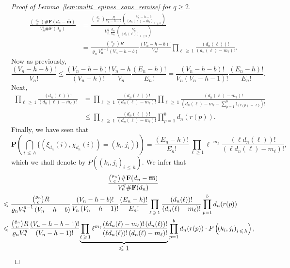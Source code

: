 \documentclass[10pt]{amsart}
\theoremstyle{definition}\newtheorem{defi}[theo]{Definition}\newtheorem{rema}[theo]{Remark}\newtheorem{exam}[theo]{Example}\newtheorem{exem}[theo]{Example}\newtheorem{nota}[theo]{Notation}
\newcommand{\ensembles}[1]{\mathbf{#1}}
\renewcommand{\P}{\ensembles{P}}
\newcommand{\1}{\ensembles{1}}
\newcommand{\ind}[1]{\1_{\{#1\}}}
\newcommand{\m}{\mathbf{m}}
\renewcommand{\le}{\leqslant}
\renewcommand{\ge}{\geqslant}
\newcommand{\edges}{E}
\newcommand{\vertices}{V}
\providecommand{\?}{}
\begin{document}
\begin{proof}[Proof of Lemma~\ref{lem:multi_epines_sans_remise} for $q \ge 2$]
\begin{align*}
\frac{\binom{\varrho_n}{c} \#\ensembles{F}\left(d_n - \overline{\m}\right)}{\vertices_n^q \#\ensembles{F}(d_n)} &= \frac{\binom{\varrho_n}{c} \frac{R}{\vertices_n-h-b} \binom{\vertices_n-h-b}{\left(d_n(\ell)-\overline{m}_\ell\right)_{\ell\,\ge\, 0}}}{\vertices_n^q \frac{\varrho_n}{\vertices_n} \binom{\vertices_n}{\left(d_n(\ell)\right)_{\ell\,\ge\, 0}}}
\\
&= \frac{\binom{\varrho_n}{c} R}{\varrho_n \vertices_n^{q-1} \left(\vertices_n-h-b\right)}
\frac{\left(\vertices_n-h-b\right)!}{\vertices_n!}
\prod_{\ell\,\ge\,1} \frac{\left(d_n(\ell)\right)!}{\left(d_n(\ell)-\overline{m}_\ell\right)!}.
\end{align*}
Now as previously,
\[
\frac{\left(\vertices_n-h-b\right)!}{\vertices_n!}
\le \frac{\left(\vertices_n-h-b\right)!}{\left(\vertices_n - h\right)!} \frac{\vertices_n-h}{\vertices_n} \frac{\left(\edges_n - h\right)!}{\edges_n!} = \frac{\left(\vertices_n-h-b\right)!}{\vertices_n\left(\vertices_n - h - 1\right)!} \frac{\left(\edges_n - h\right)!}{\edges_n!}.
\]
Next,
\begin{align*}
\prod_{\ell\,\ge\,1} \frac{\left(d_n(\ell)\right)!}{\left(d_n(\ell)-\overline{m}_\ell\right)!} &= \prod_{\ell\,\ge\,1} \frac{\left(d_n(\ell)\right)!}{\left(d_n(\ell)-m_\ell\right)!}
\prod_{\ell\,\ge\,1} \frac{\left(d_n(\ell)-m_\ell\right)!}{\left(d_n(\ell)-m_\ell-\sum\limits_{p=1}^b \ind{r(p)\,=\,\ell}\right)!}
\\
&\le \prod_{\ell\,\ge\,1} \frac{\left(d_n(\ell)\right)!}{\left(d_n(\ell)-m_\ell\right)!}
\prod_{p=1}^b d_n(r(p)).
\end{align*}
Finally, we have seen that
\[
\P\left(\bigcap_{i\,\le\,h} \big\{\left(\xi_{d_n}(i), \chi_{d_n}(i)\right) = (k_i, j_i)\big\}\right) = \frac{(\edges_n - h)!}{\edges_n!} \prod_{\ell \ge 1} \ell^{- m_\ell} \frac{(\ell d_n(\ell))!}{(\ell d_n(\ell) - m_\ell)!},
\]
which we shall denote by $P((k_i, j_i)_{i\,\le\,h})$. We infer that
\begin{multline*}
\frac{\binom{\varrho_n}{c} \#\ensembles{F}(d_n - \overline{\m})}{\vertices_n^q \#\ensembles{F}(d_n)}
\\
\mkern-30mu
\begin{aligned}
&\le \frac{\binom{\varrho_n}{c} R}{\varrho_n \vertices_n^{q-1} \left(\vertices_n-h-b\right)}
\frac{\left(\vertices_n-h-b\right)!}{\vertices_n \left(\vertices_n - h - 1\right)!} \frac{\left(\edges_n - h\right)!}{\edges_n!}
\prod_{\ell\,\ge\,1} \frac{\left(d_n(\ell)\right)!}{\left(d_n(\ell)-m_\ell\right)!}
\prod_{p=1}^b d_n(r(p))
\\
&\le \frac{\binom{\varrho_n}{c} R}{\varrho_n \vertices_n^q} \frac{\left(\vertices_n-h-b-1\right)!}{\left(\vertices_n - h - 1\right)!}\!
\underbrace{\prod_{\ell\,\ge\,1} \ell^{m_\ell} \frac{\left(\ell d_n(\ell) - m_\ell\right)! \left(d_n(\ell)\right)!}{\left(\ell d_n(\ell)\right)! \left(d_n(\ell)-m_\ell\right)!}}_{\displaystyle \le 1}
\prod_{p=1}^b d_n(r(p))
\cdot P\left(\!\left(k_i, j_i\right)_{i\,\le\,h}\right),
\end{aligned}
\end{multline*}


\end{proof}
\end{document}
